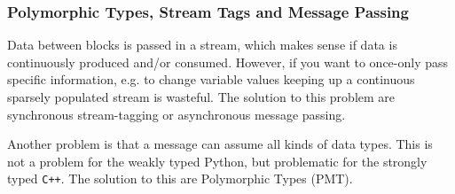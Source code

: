 \documentclass{article}
\begin{document}
\subsubsection{Polymorphic Types, Stream Tags and Message Passing}

Data between blocks is passed in a stream, which makes sense if data is continuously produced and/or consumed. However, if you want to once-only pass specific information, e.g. to change variable values keeping up a continuous sparsely populated stream is wasteful. The solution to this problem are synchronous stream-tagging or asynchronous message passing.

\bigskip

Another problem is that a message can assume all kinds of data types. This is not a problem for the weakly typed Python, but problematic for the strongly typed \texttt{C++}. The solution to this are Polymorphic Types (PMT).
\end{document}
